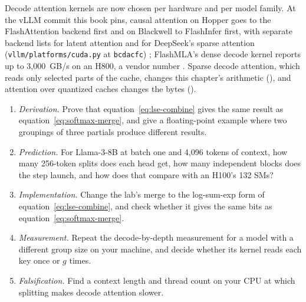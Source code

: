 
Decode attention kernels are now chosen per hardware and per model family. At
the vLLM commit this book pins, causal attention on Hopper goes to the
FlashAttention backend first and on Blackwell to FlashInfer first, with separate
backend lists for latent attention and for DeepSeek's sparse attention
(\texttt{vllm/platforms/cuda.py} at \texttt{bcdacfc})
\cite{vllm2026attentionbackends}; FlashMLA's dense decode kernel reports up to
3,000~GB/s on an H800, a vendor number \cite{deepseek2025flashmla}. Sparse decode
attention, which reads only selected parts of the cache, changes this chapter's
arithmetic (), and attention over quantized caches changes
the bytes ().

\ExercisesSection

\begin{enumerate}
\item \emph{Derivation.} Prove that equation~\eqref{eq:lse-combine} gives the
same result as equation~\eqref{eq:softmax-merge}, and give a floating-point
example where two groupings of three partials produce different results.
\item \emph{Prediction.} For Llama-3-8B at batch one and 4,096 tokens of
context, how many 256-token splits does each head get, how many independent
blocks does the step launch, and how does that compare with an H100's 132 SMs?
\item \emph{Implementation.} Change the lab's merge to the log-sum-exp form of
equation~\eqref{eq:lse-combine}, and check whether it gives the same bits as
equation~\eqref{eq:softmax-merge}.
\item \emph{Measurement.} Repeat the decode-by-depth measurement for a model
with a different group size on your machine, and decide whether its kernel
reads each key once or $g$ times.
\item \emph{Falsification.} Find a context length and thread count on your CPU
at which splitting makes decode attention slower.
\end{enumerate}


